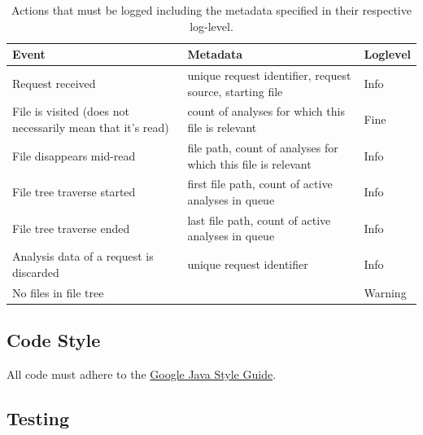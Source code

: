 \documentclass[11pt]{article} %
\begin{document}
    \begin{table}[H]
        \centering
        \begin{tabular}{p{.2\linewidth} | p{.5\linewidth} | p{.2\linewidth}}
            \textbf{Event}                                             & \textbf{Metadata}                                            & \textbf{Loglevel} \\\hline
            Request received                                           & unique request identifier, request source, starting file     & Info              \\\hline
            File is visited (does not necessarily mean that it's read) & count of analyses for which this file is relevant                     & Fine              \\\hline
            File disappears mid-read                                   & file path, count of analyses for which this file is relevant                     & Info              \\\hline
            File tree traverse started                                 & first file path, count of active analyses in queue           & Info              \\\hline
            File tree traverse ended                                   & last file path, count of active analyses in queue            & Info              \\\hline
            Analysis data of a request is discarded                    & unique request identifier                                    & Info              \\\hline
            No files in file tree                                      &                                                              & Warning
        \end{tabular}
        \caption{Actions that must be logged including the metadata specified in their respective log-level.}
        \label{tab:log_actions}
    \end{table}


    \subsection{Code Style}\label{sec:3.4}

    All code must adhere to the \href{https://google.github.io/styleguide/javaguide.html}{Google Java Style Guide}.


    \subsection{Testing}\label{sec:3.5}
\end{document}

